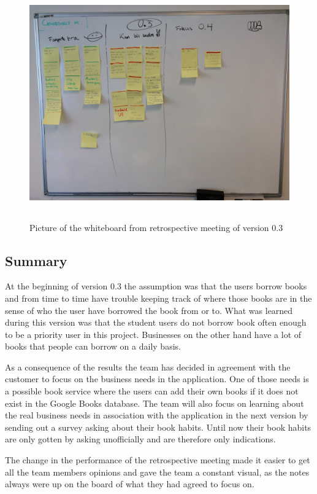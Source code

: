\begin{figure}
\centering
\includegraphics[height=10cm]{figs/v03/retrospective-3.JPG}
\caption{Picture of the whiteboard from retrospective meeting of version 0.3}
\label{fig:retrospective-3}
\end{figure}

\subsection{Summary}
At the beginning of version 0.3 the assumption was that the users borrow books and from time to time have trouble keeping track of where those books are in the sense of who the user have borrowed the book from or to. What was learned during this version was that the student users do not borrow book often enough to be a priority user in this project. Businesses on the other hand have a lot of books that people can borrow on a daily basis. 

As a consequence of the results the team has decided in agreement with the customer to focus on the business needs in the application. One of those needs is a possible book service where the users can add their own books if it does not exist in the Google Books database. The team will also focus on learning about the real business needs in association with the application in the next version by sending out a survey asking about their book habits. Until now their book habits are only gotten by asking unofficially and are therefore only indications.

The change in the performance of the retrospective meeting made it easier to get all the team members opinions and gave the team a constant visual, as the notes always were up on the board of what they had agreed to focus on.   
